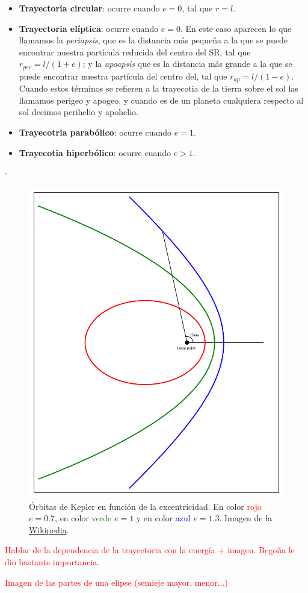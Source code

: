 \begin{itemize}
	\item \textbf{Trayectoria circular}: ocurre cuando $e=0$, tal que $r=l$.
	\item \textbf{Trayectoria elíptica}: ocurre cuando $e=0$. En este caso aparecen lo que llamamos la \textit{periapsis}, que es la distancia más pequeña a la que se puede encontrar nuestra partícula reducida del centro del SR, tal que $r_{per}=l/(1+e)$; y la \textit{apoapsis} que es la distancia más grande a la que se puede encontrar nuestra partícula del centro del, tal que $r_{ap}=l/(1-e)$. Cuando estos términos se refieren a la trayecotia de la tierra sobre el sol las llamamos perigeo y apogeo, y cuando es de un planeta cualquiera respecto al sol decimos perihelio y apohelio.
	\item \textbf{Trayecotria parabólico}: ocurre cuando $e=1$.
	\item \textbf{Trayecotia hiperbólico}: ocurre cuando $e>1$.
\end{itemize}
-
\begin{figure}[h!] \centering
	\includegraphics[width=0.5\linewidth]{Cuerpo/Ch_02/02_Kepler_Orbits.png}
	\caption{Órbitas de Kepler en función de la excentricidad. En color \textcolor{red}{rojo} $e=0.7$, en color \textcolor{green}{verde} $e=1$ y en color \textcolor{blue}{azul} $e=1.3$. Imagen de la \href{https://es.wikipedia.org/wiki/Excentricidad_orbital}{Wikipedia}.}
\end{figure}

\begin{Anotacion}
    \textcolor{red}{Hablar de la dependencia de la trayectoria con la energía + imagen. Begoña le dio bastante importancia.}
\end{Anotacion}
\begin{Anotacion}
    \textcolor{red}{Imagen de las partes de una elipse (semieje mayor, menor...)}
\end{Anotacion}

